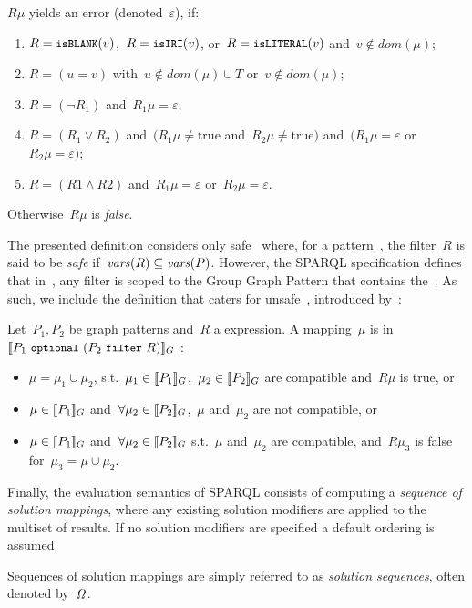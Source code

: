 \begin{definition}
\noindent$R\mu$ yields an error (denoted~$\varepsilon$), if: 
{
\begin{enumerate}[(1)]
\setlength{\itemsep}{-1.5mm}
%
\item $R = \texttt{{\small isBLANK}}(v)$,~$R = \texttt{{\small isIRI}}(v)$, or~$R = \texttt{{\small isLITERAL}}(v)$ 
  and~$v \not\in \mathit{dom}(\mu)$;
\item $R = (u = v)$ with~$u \not\in \mathit{dom}(\mu)\cup T$ or~$v\not\in \mathit{dom}(\mu)$;
\item $R = (\neg R_1)$ and~$R_1\mu=\varepsilon$;
\item $R = (R_1 \vee R_2 )$ and~$(R_1\mu\not=\mathrm{true}$ and~$R_2\mu\not=\mathrm{true})$ and~$(R_1\mu=\varepsilon$ or~$R_2\mu=\varepsilon)$;
\item $R = (R1 \wedge R2)$ and~$R_1\mu=\varepsilon$ or~$R_2\mu=\varepsilon$.
\end{enumerate}}
\noindent Otherwise~$R\mu$ is \emph{false}.
\end{definition}
%
\noindent The presented definition considers only safe~ where, for a pattern~, the filter~$R$ is said to be \emph{safe} if~$\mathit{vars}\!\left(R\right) \subseteq \mathit{vars}\!\left(P\right)$.
%
However, the SPARQL specification defines that in~, any filter is scoped to the Group Graph
Pattern that contains the~\OPTIONAL.
%
As such, we include the definition that caters for unsafe~, introduced
by~\citet{AnglesGutierrez:2008aa}:
%
\begin{definition}
  \label{def:optsemantics}
  Let~$P_1, P_2$ be graph patterns and~$R$ a \FILTER expression. A mapping~$\mu$ is in~$[\![ P_1\ \texttt{{\small optional}}\ (P_2\
    \texttt{{\small filter}}\ R) ]\!]_{G}$ \iff:
  \begin{itemize}[nosep]
  \item $\mu = \mu_1\cup \mu_2$, s.t.~$\mu_1 \in [\![ P_1 ]\!]_{G}$,~$\mu_2 \in [\![ P_2  ]\!]_{G}$ are compatible and~$R\mu$
    is true, or
  \item $\mu \in [\![ P_1 ]\!]_{G}$ and~$\forall \mu_2 \in [\![ P_2 ]\!]_{G}$,~$\mu$ and~$\mu_2$ are not compatible, or
  \item $\mu \in [\![ P_1 ]\!]_{G}$ and~$\forall \mu_2 \in [\![ P_2 ]\!]_{G}$ s.t.~$\mu$ and~$\mu_2$ are compatible,
    and~$R\mu_{3}$ is false for~$\mu_{3} = \mu \cup \mu_2$.
  \end{itemize}
\end{definition}


%
Finally, the evaluation semantics of SPARQL consists of computing a \emph{sequence of solution mappings}, where any
existing solution modifiers are applied to the multiset of results.  If no solution modifiers are specified a default
ordering is assumed.
\begin{definition}
  Sequences of solution mappings are simply referred to as \emph{solution sequences}, often denoted by~${\mathit{\Omega}}_{\mathit{}}^{\mathit{}}$.
\end{definition}
%


